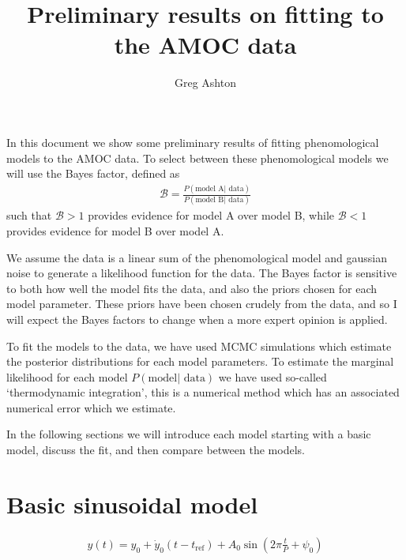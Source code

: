 \documentclass{article}
\newcommand{\tref}{t_{\textrm{ref}}}
\begin{document}
\title{Preliminary results on fitting to the AMOC data}
\author{Greg Ashton}
\date{}
\maketitle

In this document we show some preliminary results of fitting phenomological models
to the AMOC data. To select between these phenomological models we will use the
Bayes factor, defined as
\begin{align}
\mathcal{B} = \frac{P(\textrm{model A}| \textrm{ data})}{P(\textrm{model B}| \textrm{ data})}
\end{align}
such that $\mathcal{B} > 1$ provides evidence for model A over model B, while
$\mathcal{B} < 1$ provides evidence for model B over model A. 

We assume the data is a linear sum of the phenomological model and
gaussian noise to generate a likelihood function for the data. The Bayes factor
is sensitive to both how well the model fits the data, and also the priors chosen
for each model parameter. These priors have been chosen crudely from the data,
and so I will expect the Bayes factors to change when a more expert opinion is
applied.

To fit the models to the data, we have used MCMC simulations which estimate the
posterior distributions for each model parameters. To estimate the marginal
likelihood for each model $P(\textrm{model}| \textrm{ data})$ we have used
so-called `thermodynamic integration', this is a numerical method which has an
associated numerical error which we estimate.

In the following sections we will introduce each model starting with a basic
model, discuss the fit, and then compare between the models.

\section{Basic sinusoidal model}

\begin{align}
y(t) = y_0 + \dot{y}_0(t - \tref) + A_0 \sin\left(2\pi \frac{t}{P} + \psi_0\right)
\end{align}
\end{document}
